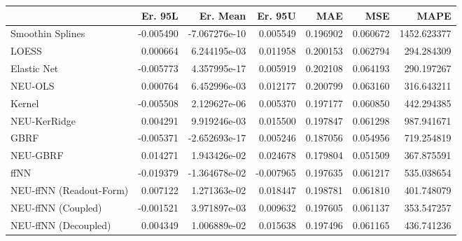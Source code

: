 \begin{tabular}{lrrrrrr}
\toprule
{} &   Er. 95L &      Er. Mean &   Er. 95U &       MAE &       MSE &         MAPE \\
\midrule
Smoothin Splines        & -0.005490 & -7.067276e-10 &  0.005549 &  0.196902 &  0.060672 &  1452.623377 \\
LOESS                   &  0.000664 &  6.244195e-03 &  0.011958 &  0.200153 &  0.062794 &   294.284309 \\
Elastic Net             & -0.005773 &  4.357995e-17 &  0.005919 &  0.202108 &  0.064193 &   290.197267 \\
NEU-OLS                 &  0.000764 &  6.452996e-03 &  0.012177 &  0.200799 &  0.063160 &   316.643211 \\
Kernel                  & -0.005508 &  2.129627e-06 &  0.005370 &  0.197177 &  0.060850 &   442.294385 \\
NEU-KerRidge            &  0.004291 &  9.919246e-03 &  0.015500 &  0.197847 &  0.061298 &   987.941671 \\
GBRF                    & -0.005371 & -2.652693e-17 &  0.005246 &  0.187056 &  0.054956 &   719.254819 \\
NEU-GBRF                &  0.014271 &  1.943426e-02 &  0.024678 &  0.179804 &  0.051509 &   367.875591 \\
ffNN                    & -0.019379 & -1.364678e-02 & -0.007965 &  0.197635 &  0.061217 &   535.038654 \\
NEU-ffNN (Readout-Form) &  0.007122 &  1.271363e-02 &  0.018447 &  0.198781 &  0.061810 &   401.748079 \\
NEU-ffNN (Coupled)      & -0.001521 &  3.971897e-03 &  0.009632 &  0.197605 &  0.061137 &   353.547257 \\
NEU-ffNN (Decoupled)    &  0.004349 &  1.006889e-02 &  0.015638 &  0.197496 &  0.061165 &   436.741236 \\
\bottomrule
\end{tabular}
